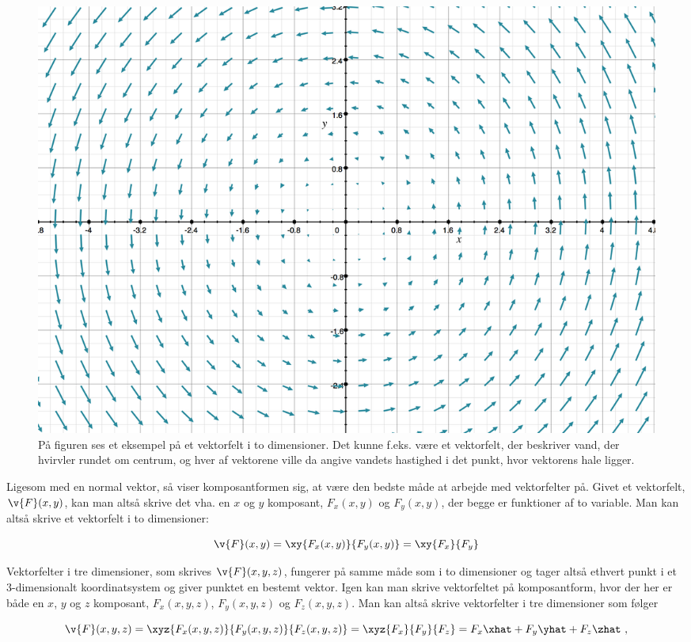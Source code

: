 \begin{figure}[h!]
	\centering
	\includegraphics[scale=0.38]{matematik/fig/vecfield_2D.png}
	\caption{På figuren ses et eksempel på et vektorfelt i to dimensioner. Det kunne f.eks. være et vektorfelt, der beskriver vand, der hvirvler rundet om centrum, og hver af vektorene ville da angive vandets hastighed i det punkt, hvor vektorens hale ligger.}
	\label{vecfield}
\end{figure}

Ligesom med en normal vektor, så viser komposantformen sig, at være den bedste måde at arbejde med vektorfelter på. Givet et vektorfelt, $\v{F}(x,y)$, kan man altså skrive det vha. en $x$ og $y$ komposant, $F_x (x,y)$ og $F_y(x,y)$, der begge er funktioner af to variable. Man kan altså skrive et vektorfelt i to dimensioner:

\begin{equation}
\v{F} (x,y) = \xy{F_x(x,y)}{F_y(x,y)} = \xy{F_x}{F_y}
\end{equation}

\vspace{2mm}

Vektorfelter i tre dimensioner, som skrives $\v{F}(x,y,z)$, fungerer på samme måde som i to dimensioner og tager altså ethvert punkt i et 3-dimensionalt koordinatsystem og giver punktet en bestemt vektor. Igen kan man skrive vektorfeltet på komposantform, hvor der her er både en $x$, $y$ og $z$ komposant, $F_x (x,y,z)$, $F_y (x,y,z)$ og $F_z (x,y,z)$. Man kan altså skrive vektorfelter i tre dimensioner som følger

\begin{equation}
\v{F}(x,y,z) = \xyz{F_x(x,y,z)}{F_y(x,y,z)}{F_z(x,y,z)} = \xyz{F_x}{F_y}{F_z} =  F_x \xhat + F_y \yhat + F_z \zhat \ ,
\end{equation} 

